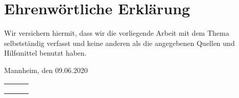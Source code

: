 
\clearpage
\chapter*{Ehrenwörtliche Erklärung}

Wir versichern hiermit, dass wir die vorliegende Arbeit mit dem Thema \textit{\DerTitelDerArbeit} selbstständig verfasst und keine anderen als die angegebenen Quellen und Hilfsmittel benutzt haben.

\vspace{2cm}
Mannheim, den 09.06.2020

\vspace{1cm}

\begin{table}[h!]
	\setlength\tabcolsep{0pt}
	\renewcommand{\arraystretch}{1.4}
	\begin{tabular}{L{5.1cm}C{5.1cm}R{5.1cm}}
		\authorSG & \authorRF & \authorMS \\
		& & \\
		\authorEJ & \authorNL & \authorJR \\
	\end{tabular}
\end{table}
